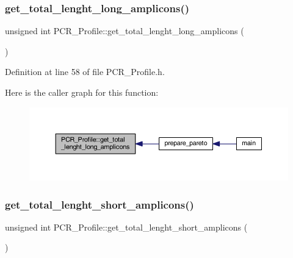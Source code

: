 \subsubsection{\texorpdfstring{get\+\_\+total\+\_\+lenght\+\_\+long\+\_\+amplicons()}{get\_total\_lenght\_long\_amplicons()}}
{\footnotesize\ttfamily unsigned int P\+C\+R\+\_\+\+Profile\+::get\+\_\+total\+\_\+lenght\+\_\+long\+\_\+amplicons (\begin{DoxyParamCaption}{ }\end{DoxyParamCaption})\hspace{0.3cm}{\ttfamily [inline]}}



Definition at line 58 of file P\+C\+R\+\_\+\+Profile.\+h.

Here is the caller graph for this function\+:
\nopagebreak
\begin{figure}[H]
\begin{center}
\leavevmode
\includegraphics[width=350pt]{class_p_c_r___profile_adf41a697d05489582745d650d4e7c956_icgraph}
\end{center}
\end{figure}
\mbox{\label{class_p_c_r___profile_aa8f3e8fc43865af8734090436a0d729e}} 
\subsubsection{\texorpdfstring{get\+\_\+total\+\_\+lenght\+\_\+short\+\_\+amplicons()}{get\_total\_lenght\_short\_amplicons()}}
{\footnotesize\ttfamily unsigned int P\+C\+R\+\_\+\+Profile\+::get\+\_\+total\+\_\+lenght\+\_\+short\+\_\+amplicons (\begin{DoxyParamCaption}{ }\end{DoxyParamCaption})\hspace{0.3cm}{\ttfamily [inline]}}



